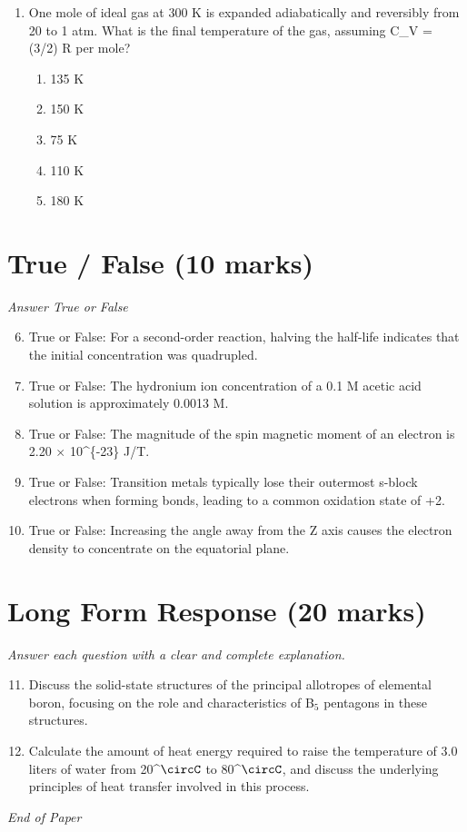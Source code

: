 \documentclass[12pt]{article}
\begin{document}
\begin{enumerate}[label=\arabic*.]
\begin{enumerate}[label=(\alph*)]
    \item 13.00987 amu
    \item 13.00335 amu
    \item 13.00739 amu
\end{enumerate}
\item One mole of ideal gas at 300 K is expanded adiabatically and reversibly from 20 to 1 atm. What is the final temperature of the gas, assuming C\_V = (3/2) R per mole?
\begin{enumerate}[label=(\alph*)]
    \item 135 K
    \item 150 K
    \item 75 K
    \item 110 K
    \item 180 K
\end{enumerate}
\end{enumerate}

\section*{True / False (10 marks)}
\textit{Answer True or False}
\begin{enumerate}[label=\arabic*.]
\setcounter{enumi}{5}
\item True or False: For a second-order reaction, halving the half-life indicates that the initial concentration was quadrupled.
\item True or False: The hydronium ion concentration of a 0.1 M acetic acid solution is approximately 0.0013 M.
\item True or False: The magnitude of the spin magnetic moment of an electron is 2.20 \ensuremath{\times} 10^\{-23\} J/T.
\item True or False: Transition metals typically lose their outermost s-block electrons when forming bonds, leading to a common oxidation state of +2.
\item True or False: Increasing the angle away from the Z axis causes the electron density to concentrate on the equatorial plane.
\end{enumerate}

\section*{Long Form Response (20 marks)}
\textit{Answer each question with a clear and complete explanation.}
\begin{enumerate}[label=\arabic*.]
\setcounter{enumi}{10}
\item Discuss the solid-state structures of the principal allotropes of elemental boron, focusing on the role and characteristics of B$_{5}$ pentagons in these structures.
\item Calculate the amount of heat energy required to raise the temperature of 3.0 liters of water from 20^\ensuremath{\circC} to 80^\ensuremath{\circC}, and discuss the underlying principles of heat transfer involved in this process.
\end{enumerate}

\vfill
\noindent\textit{End of Paper}
\end{document}

